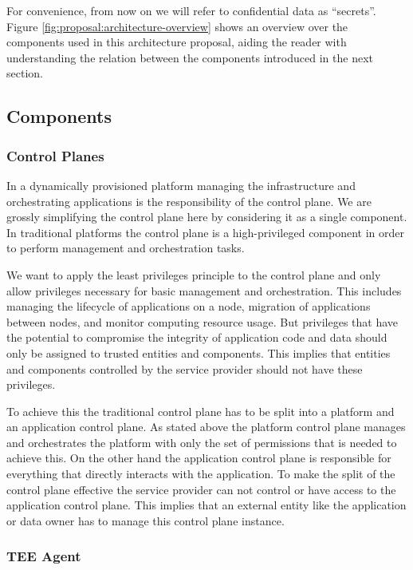 For convenience, from now on we will refer to confidential data as ``secrets''.
Figure \ref{fig:proposal:architecture-overview} shows an overview over the
components used in this architecture proposal, aiding the reader with
understanding the relation between the components introduced in the next
section.

\subsection{Components}

\subsubsection{Control Planes}

In a dynamically provisioned platform managing the infrastructure and
orchestrating applications is the responsibility of the control plane. We are
grossly simplifying the control plane here by considering it as a single
component. In traditional platforms the control plane is a high-privileged
component in order to perform management and orchestration tasks.

We want to apply the least privileges principle to the control plane and only
allow privileges necessary for basic management and orchestration. This includes
managing the lifecycle of applications on a node, migration of applications
between nodes, and monitor computing resource usage. But privileges that have
the potential to compromise the integrity of application code and data should
only be assigned to trusted entities and components. This implies that entities
and components controlled by the service provider should not have these
privileges.

To achieve this the traditional control plane has to be split into a platform
and an application control plane. As stated above the platform control plane
manages and orchestrates the platform with only the set of permissions that is
needed to achieve this. On the other hand the application control plane is
responsible for everything that directly interacts with the application. To make
the split of the control plane effective the service provider can not control or
have access to the application control plane. This implies that an external
entity like the application or data owner has to manage this control plane
instance.

\subsubsection{TEE Agent}

